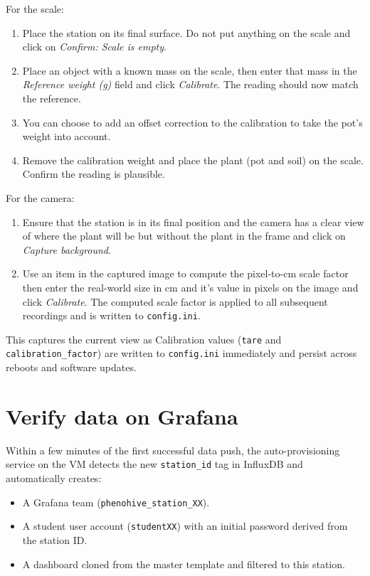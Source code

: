 For the scale:
\begin{enumerate}
    \item Place the station on its final surface. Do not put anything on the scale and click on \emph{Confirm: Scale is empty}.
    \item Place an object with a known mass on the scale, then enter that mass in the \emph{Reference weight (g)} field and click \emph{Calibrate}. The reading should now match the reference.
    \item You can choose to add an offset correction to the calibration to take the pot's weight into account.
    \item Remove the calibration weight and place the plant (pot and soil) on the scale. Confirm the reading is plausible.
\end{enumerate}

For the camera:
\begin{enumerate}
    \item Ensure that the station is in its final position and the camera has a clear view of where the plant will be but without the plant in the frame and click on \emph{Capture background}. 
    \item Use an item in the captured image to compute the pixel-to-cm scale factor then enter the real-world size in cm and it's value in pixels on the image and click \emph{Calibrate}. The computed scale factor is applied to all subsequent recordings and is written to \texttt{config.ini}.
    
\end{enumerate}   
    This captures the current view as Calibration values (\texttt{tare} and \texttt{calibration\_factor}) are written to \texttt{config.ini} immediately and persist across reboots and software updates.

\section{Verify data on Grafana}

Within a few minutes of the first successful data push, the auto-provisioning service on the VM detects the new \texttt{station\_id} tag in InfluxDB and automatically creates:
\begin{itemize}
    \item A Grafana team (\texttt{phenohive\_station\_XX}).
    \item A student user account (\texttt{studentXX}) with an initial password derived from the station ID.
    \item A dashboard cloned from the master template and filtered to this station.
\end{itemize}

